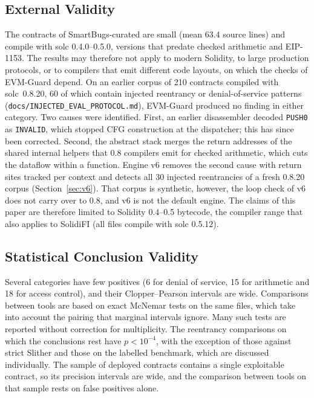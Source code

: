 \documentclass[pdflatex,sn-mathphys]{sn-jnl}
\theoremstyle{thmstyletwo}
\theoremstyle{thmstyletwo}
\begin{document}
\subsection{External Validity}\label{sec:threats:external}
The contracts of SmartBugs-curated are small (mean 63.4 source lines) and compile with solc 0.4.0--0.5.0, versions that predate checked arithmetic and EIP-1153. The results may therefore not apply to modern Solidity, to large production protocols, or to compilers that emit different code layouts, on which the checks of EVM-Guard depend. On an earlier corpus of 210 contracts compiled with solc~0.8.20, 60 of which contain injected reentrancy or denial-of-service patterns (\texttt{docs/INJECTED\_EVAL\_PROTOCOL.md}), EVM-Guard produced no finding in either category. Two causes were identified. First, an earlier disassembler decoded \texttt{PUSH0} as \texttt{INVALID}, which stopped CFG construction at the dispatcher; this has since been corrected. Second, the abstract stack merges the return addresses of the shared internal helpers that 0.8 compilers emit for checked arithmetic, which cuts the dataflow within a function. Engine v6 removes the second cause with return sites tracked per context and detects all 30 injected reentrancies of a fresh 0.8.20 corpus (Section~\ref{sec:v6}). That corpus is synthetic, however, the loop check of v6 does not carry over to 0.8, and v6 is not the default engine. The claims of this paper are therefore limited to Solidity 0.4--0.5 bytecode, the compiler range that also applies to SolidiFI (all files compile with solc 0.5.12).

\subsection{Statistical Conclusion Validity}\label{sec:threats:statistical}
Several categories have few positives (6 for denial of service, 15 for arithmetic and 18 for access control), and their Clopper--Pearson intervals are wide. Comparisons between tools are based on exact McNemar tests on the same files, which take into account the pairing that marginal intervals ignore. Many such tests are reported without correction for multiplicity. The reentrancy comparisons on which the conclusions rest have $p < 10^{-4}$, with the exception of those against strict Slither and those on the labelled benchmark, which are discussed individually. The sample of deployed contracts contains a single exploitable contract, so its precision intervals are wide, and the comparison between tools on that sample rests on false positives alone.
\end{document}
